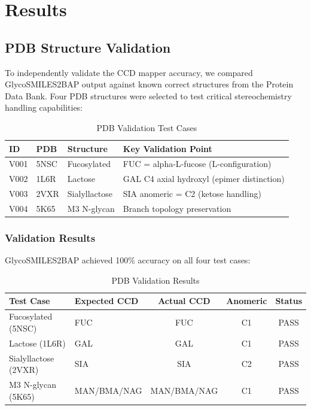 \section{Results}

\subsection{PDB Structure Validation}

To independently validate the CCD mapper accuracy, we compared GlycoSMILES2BAP output against known correct structures from the Protein Data Bank. Four PDB structures were selected to test critical stereochemistry handling capabilities:

\begin{table}[h]
\centering
\caption{PDB Validation Test Cases}
\begin{tabular}{lllp{5cm}}
\toprule
ID & PDB & Structure & Key Validation Point \\
\midrule
V001 & 5NSC & Fucosylated & FUC = alpha-L-fucose (L-configuration) \\
V002 & 1L6R & Lactose & GAL C4 axial hydroxyl (epimer distinction) \\
V003 & 2VXR & Sialyllactose & SIA anomeric = C2 (ketose handling) \\
V004 & 5K65 & M3 N-glycan & Branch topology preservation \\
\bottomrule
\end{tabular}
\label{tab:pdb_cases}
\end{table}

\subsubsection{Validation Results}

GlycoSMILES2BAP achieved 100\% accuracy on all four test cases:

\begin{table}[h]
\centering
\caption{PDB Validation Results}
\begin{tabular}{llccc}
\toprule
Test Case & Expected CCD & Actual CCD & Anomeric & Status \\
\midrule
Fucosylated (5NSC) & FUC & FUC & C1 & PASS \\
Lactose (1L6R) & GAL & GAL & C1 & PASS \\
Sialyllactose (2VXR) & SIA & SIA & C2 & PASS \\
M3 N-glycan (5K65) & MAN/BMA/NAG & MAN/BMA/NAG & C1 & PASS \\
\bottomrule
\end{tabular}
\label{tab:pdb_results}
\end{table}


